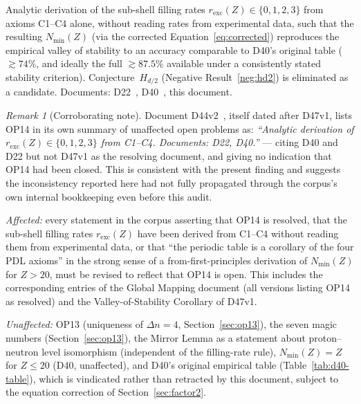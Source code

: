 \documentclass[12pt,a4paper]{article}
\theoremstyle{plain}
\theoremstyle{definition}
\theoremstyle{remark}
\newtheorem{remark}[theorem]{Remark}
\newenvironment{openproblem}[1][]{%
\begin{tcolorbox}[openproblemstyle,title={Open Problem\ifx\relax#1\relax\else: #1\fi}]}{\end{tcolorbox}}
\newcommand{\Dn}{\Delta n}
\newcommand{\Nmin}{N_{\min}}
\newcommand{\rexc}{r_{\mathrm{exc}}}
\begin{document}
\begin{openproblem}[OP14, reopened]
Analytic derivation of the sub-shell filling rates $\rexc(Z)\in\{0,1,2,3\}$ from axioms C1--C4 alone, without reading rates from experimental data, such that the resulting $\Nmin(Z)$ (via the corrected Equation~\eqref{eq:corrected}) reproduces the empirical valley of stability to an accuracy comparable to D40's original table ($\gtrsim74\%$, and ideally the full $\gtrsim87.5\%$ available under a consistently stated stability criterion). Conjecture~$H_{d/2}$ (Negative Result~\ref{neg:hd2}) is eliminated as a candidate. Documents: D22~\citep{PDL_D22_2026}, D40~\citep{PDL_D40_2026}, this document.
\end{openproblem}

\begin{remark}[Corroborating note]
Document D44v2~\citep{PDL_D44v2_2026}, itself dated after D47v1, lists OP14 in its own summary of unaffected open problems as: \emph{``Analytic derivation of $\rexc(Z)\in\{0,1,2,3\}$ from C1--C4. Documents: D22, D40.''} --- citing D40 and D22 but not D47v1 as the resolving document, and giving no indication that OP14 had been closed. This is consistent with the present finding and suggests the inconsistency reported here had not fully propagated through the corpus's own internal bookkeeping even before this audit.
\end{remark}

\emph{Affected:} every statement in the corpus asserting that OP14 is resolved, that the sub-shell filling rates $\rexc(Z)$ have been derived from C1--C4 without reading them from experimental data, or that ``the periodic table is a corollary of the four PDL axioms'' in the strong sense of a from-first-principles derivation of $\Nmin(Z)$ for $Z>20$, must be revised to reflect that OP14 is open. This includes the corresponding entries of the Global Mapping document (all versions listing OP14 as resolved) and the Valley-of-Stability Corollary of D47v1.

\emph{Unaffected:} OP13 (uniqueness of $\Dn=4$, Section~\ref{sec:op13}), the seven magic numbers (Section~\ref{sec:op13}), the Mirror Lemma as a statement about proton--neutron level isomorphism (independent of the filling-rate rule), $\Nmin(Z)=Z$ for $Z\le20$ (D40, unaffected), and D40's original empirical table (Table~\ref{tab:d40-table}), which is vindicated rather than retracted by this document, subject to the equation correction of Section~\ref{sec:factor2}.

\end{document}
